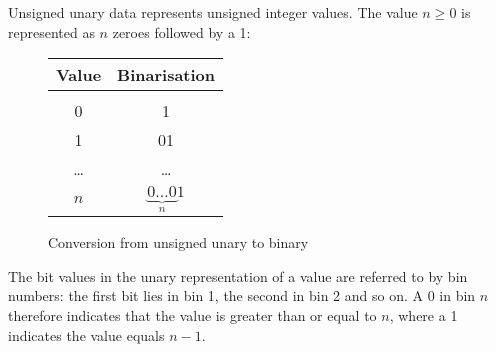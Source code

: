 
Unsigned unary data represents unsigned integer values. The value
$n \geq 0$ is represented as $n$ zeroes followed by a 1:

\begin{figure}[h]
\begin{tabular}{c|c}
Value & Binarisation\\
\hline\\
0  & 1 \\
1  & 01 \\
\dots & \dots\\
$n$   & $\underbrace{0\dots0}_n 1$
\end{tabular}

\caption{Conversion from unsigned unary to binary}
\end{figure}

The bit values in the unary representation of a value are referred to by
bin numbers: the first bit lies in bin 1, the second in bin 2 and so on.
A 0 in bin $n$ therefore indicates that the value is greater than or equal
to $n$, where a 1 indicates the value equals $n-1$.

